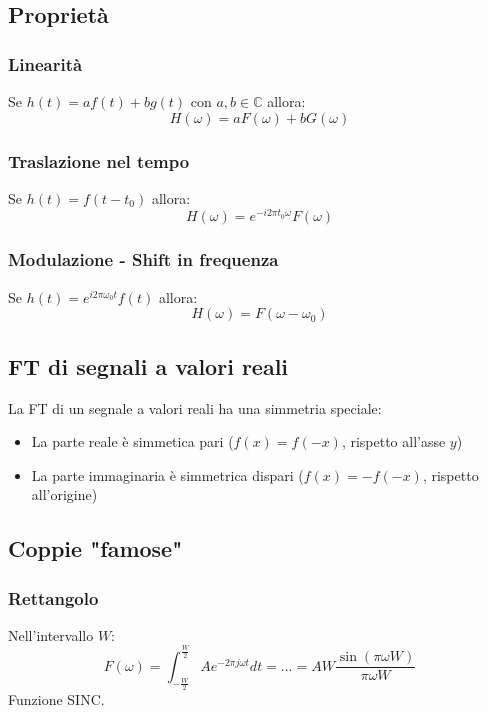 \documentclass[12pt, a4paper]{report}
\begin{document}
\subsection{Proprietà}
\subsubsection{Linearità}
Se $h(t)=af(t)+bg(t)$ con $a,b \in \mathbb{C}$ allora:
\begin{equation*}
    H(\omega) = aF(\omega)+bG(\omega)
\end{equation*}
\subsubsection{Traslazione nel tempo}
Se $h(t) = f(t-t_{0})$ allora:
\begin{equation*}
    H(\omega) = e^{-i2\pi t_{0}\omega}F(\omega)
\end{equation*}
\subsubsection{Modulazione - Shift in frequenza}
Se $h(t) = e^{i2\pi \omega_{0}t}f(t)$ allora:
\begin{equation*}
    H(\omega) = F(\omega-\omega_{0})
\end{equation*}
\subsection{FT di segnali a valori reali}
La FT di un segnale a valori reali ha una simmetria speciale:
\begin{itemize}
    \item La parte reale è simmetica pari ($f(x)=f(-x)$, rispetto all'asse $y$)
    \item La parte immaginaria è simmetrica dispari ($f(x)=-f(-x)$, rispetto all'origine)
\end{itemize}
\subsection{Coppie "famose"}
\subsubsection{Rettangolo}
Nell'intervallo $W$:
\begin{equation*}
    F(\omega)=\int_{-\frac{W}{2}}^{\frac{W}{2}} Ae^{-2\pi j\omega t}dt = \ldots = AW\frac{\sin(\pi\omega W)}{\pi\omega W}
\end{equation*}
Funzione SINC.
\end{document}
